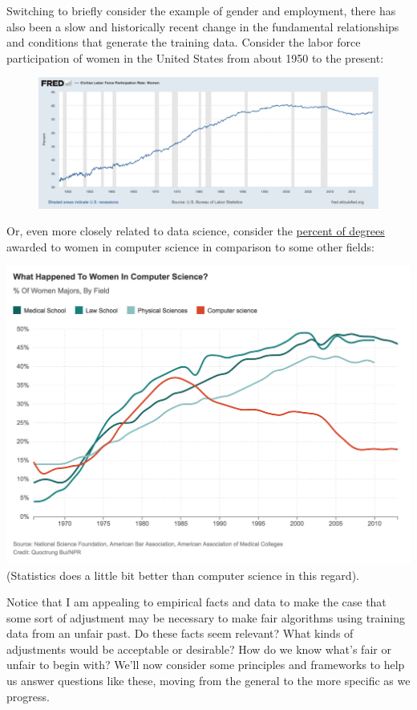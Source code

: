 \documentclass[]{book}
\theoremstyle{definition}
\theoremstyle{definition}
\theoremstyle{definition}
\theoremstyle{remark}
\begin{document}
Switching to briefly consider the example of gender and employment,
there has also been a slow and historically recent change in the
fundamental relationships and conditions that generate the training
data. Consider the labor force participation of women in the United
States from about 1950 to the present:

\begin{figure}
\centering
\includegraphics{fredfemalelabor.png}
\caption{}
\end{figure}

Or, even more closely related to data science, consider the
\href{https://www.npr.org/sections/money/2014/10/21/357629765/when-women-stopped-coding}{percent
of degrees} awarded to women in computer science in comparison to some
other fields:

\includegraphics{womenincs.png} (Statistics does a little bit better
than computer science in this regard).

Notice that I am appealing to empirical facts and data to make the case
that some sort of adjustment may be necessary to make fair algorithms
using training data from an unfair past. Do these facts seem relevant?
What kinds of adjustments would be acceptable or desirable? How do we
know what's fair or unfair to begin with? We'll now consider some
principles and frameworks to help us answer questions like these, moving
from the general to the more specific as we progress.
\end{document}
